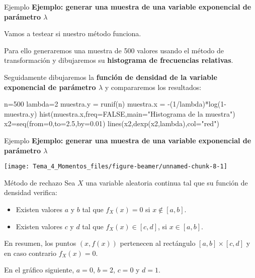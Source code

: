 \documentclass[
  ignorenonframetext,
  aspectratio=169]{beamer}
\newenvironment{Shaded}{\begin{snugshade}}{\end{snugshade}}
\newcommand{\AttributeTok}[1]{\textcolor[rgb]{0.77,0.63,0.00}{#1}}
\newcommand{\ConstantTok}[1]{\textcolor[rgb]{0.00,0.00,0.00}{#1}}
\newcommand{\DecValTok}[1]{\textcolor[rgb]{0.00,0.00,0.81}{#1}}
\newcommand{\FloatTok}[1]{\textcolor[rgb]{0.00,0.00,0.81}{#1}}
\newcommand{\FunctionTok}[1]{\textcolor[rgb]{0.00,0.00,0.00}{#1}}
\newcommand{\NormalTok}[1]{#1}
\newcommand{\OtherTok}[1]{\textcolor[rgb]{0.56,0.35,0.01}{#1}}
\newcommand{\SpecialCharTok}[1]{\textcolor[rgb]{0.00,0.00,0.00}{#1}}
\newcommand{\StringTok}[1]{\textcolor[rgb]{0.31,0.60,0.02}{#1}}
\providecommand{\tightlist}{%
  \setlength{\itemsep}{0pt}\setlength{\parskip}{0pt}}
\begin{document}
\begin{frame}[fragile]{Ejemplo}
\protect\hypertarget{ejemplo-6}{}
\textbf{Ejemplo: generar una muestra de una variable exponencial de
parámetro \(\lambda\)}

Vamos a testear si nuestro método funciona.

Para ello generaremos una muestra de 500 valores usando el método de
transformación y dibujaremos su \textbf{histograma de frecuencias
relativas}.

Seguidamente dibujaremos la \textbf{función de densidad de la variable
exponencial de parámetro \(\lambda\)} y compararemos los resultados:

\begin{Shaded}
\begin{Highlighting}[]
\NormalTok{n}\OtherTok{=}\DecValTok{500}
\NormalTok{lambda}\OtherTok{=}\DecValTok{2}
\NormalTok{muestra.y }\OtherTok{=} \FunctionTok{runif}\NormalTok{(n)}
\NormalTok{muestra.x }\OtherTok{=} \SpecialCharTok{{-}}\NormalTok{(}\DecValTok{1}\SpecialCharTok{/}\NormalTok{lambda)}\SpecialCharTok{*}\FunctionTok{log}\NormalTok{(}\DecValTok{1}\SpecialCharTok{{-}}\NormalTok{muestra.y)}
\FunctionTok{hist}\NormalTok{(muestra.x,}\AttributeTok{freq=}\ConstantTok{FALSE}\NormalTok{,}\AttributeTok{main=}\StringTok{"Histograma de la muestra"}\NormalTok{)}
\NormalTok{x2}\OtherTok{=}\FunctionTok{seq}\NormalTok{(}\AttributeTok{from=}\DecValTok{0}\NormalTok{,}\AttributeTok{to=}\FloatTok{2.5}\NormalTok{,}\AttributeTok{by=}\FloatTok{0.01}\NormalTok{)}
\FunctionTok{lines}\NormalTok{(x2,}\FunctionTok{dexp}\NormalTok{(x2,lambda),}\AttributeTok{col=}\StringTok{"red"}\NormalTok{)}
\end{Highlighting}
\end{Shaded}
\end{frame}

\begin{frame}{Ejemplo}
\protect\hypertarget{ejemplo-7}{}
\textbf{Ejemplo: generar una muestra de una variable exponencial de
parámetro \(\lambda\)}

\texttt{[image: Tema\_4\_Momentos\_files/figure-beamer/unnamed-chunk-8-1]}
\end{frame}

\begin{frame}{Método de rechazo}
\protect\hypertarget{muxe9todo-de-rechazo}{}
Sea \(X\) una variable aleatoria continua tal que su función de densidad
verifica:

\begin{itemize}
\tightlist
\item
  Existen valores \(a\) y \(b\) tal que \(f_X(x)= 0\) si
  \(x\not\in [a,b]\).
\item
  Existen valores \(c\) y \(d\) tal que \(f_X(x)\in [c,d]\), si
  \(x\in [a,b]\).
\end{itemize}

En resumen, los puntos \((x,f(x))\) pertenecen al rectángulo
\([a,b]\times [c,d]\) y en caso contrario \(f_X(x)=0\).

En el gráfico siguiente, \(a=0\), \(b=2\), \(c=0\) y \(d=1\).
\end{frame}
\end{document}
